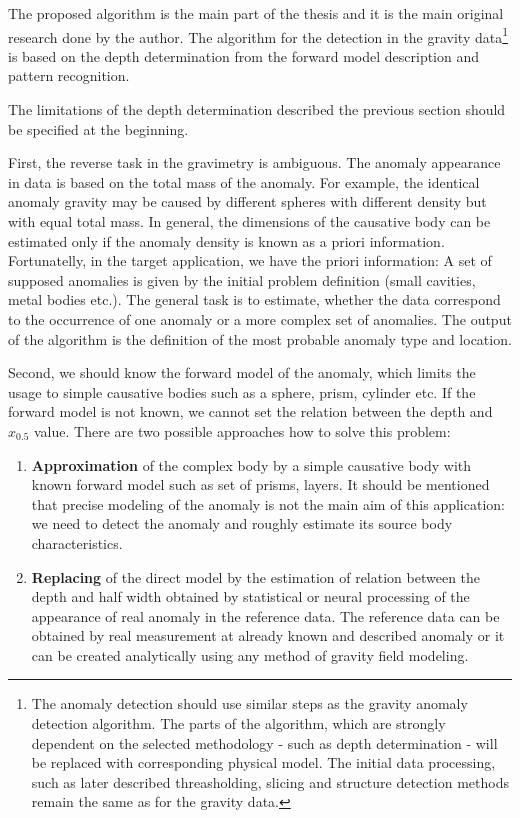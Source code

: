 \documentclass[FM]{tulthesis}
\begin{document}
The proposed algorithm is the main part of the thesis and it is the main original research done by the author. The algorithm for the detection in the gravity data\footnote{The anomaly detection should use similar steps as the gravity anomaly detection algorithm. The parts of the algorithm, which are strongly dependent on the selected methodology - such as depth determination - will be replaced with corresponding physical model. The initial data processing, such as later described threasholding, slicing and structure detection methods remain the same as for the gravity data.} is based on the depth determination from the forward model description and pattern recognition. 

The limitations of the depth determination described the previous section should be specified at the beginning. 

First, the reverse task in the gravimetry is ambiguous. The anomaly appearance in data is based on the total mass of the anomaly. For example, the identical anomaly gravity may be caused by different spheres with different density but with equal total mass. In general, the dimensions of the causative body can be estimated only if the anomaly density is known as a priori information. Fortunatelly, in the target application, we have the priori information: A set of supposed anomalies is given by the initial problem definition (small cavities, metal bodies etc.). The general task is to estimate, whether the data correspond to the occurrence of one anomaly or a more complex set of anomalies. The output of the algorithm is the definition of the most probable anomaly type and location.

 Second, we should know the forward model of the anomaly, which limits the usage to simple causative bodies such as a sphere, prism, cylinder etc. If the forward model is not known, we cannot set the relation between the depth and $x_{0.5}$ value. There are two possible approaches how to solve this problem:

\begin{enumerate}

\item \textbf{Approximation} of the complex body by a simple causative body with known forward model such as set of prisms, layers. It should be mentioned that precise modeling of the anomaly is not the main aim of this application: we need to detect the anomaly and roughly estimate its source body characteristics.

\item \textbf{Replacing} of the direct model by the estimation of relation between the depth and half width obtained by statistical or neural processing of the appearance of real anomaly in the reference data. The reference data can be obtained by real measurement at already known and described anomaly or it can be created analytically using any method of gravity field modeling. 

\end{enumerate}
\end{document}
